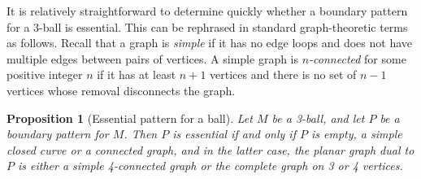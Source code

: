 \documentclass[oneside]{amsart}
\numberwithin{equation}{section}
\theoremstyle{plain}
\newtheorem{proposition}[equation]{Proposition}
\theoremstyle{definition}
\begin{document}
It is relatively straightforward to determine quickly whether a boundary pattern for a 3-ball is essential.
This can be rephrased in standard graph-theoretic terms as follows. Recall that a graph is \emph{simple}
if it has no edge loops and does not have multiple edges between pairs of vertices. A simple graph is \emph{$n$-connected} for some
positive integer $n$ if it has at least $n+1$ vertices and there is no set of $n-1$ vertices whose removal disconnects
the graph.


\begin{proposition}[Essential pattern for a ball]
\label{Prop:EssentialBall}
Let $M$ be a 3-ball, and let $P$ be a boundary pattern for $M$.
Then $P$ is essential if and only if $P$ is empty, a simple closed curve or a connected
graph, and in the latter case, the planar graph dual to $P$ is either a simple 4-connected graph or the complete graph on 3 or 4 vertices.
\end{proposition}
\end{document}
